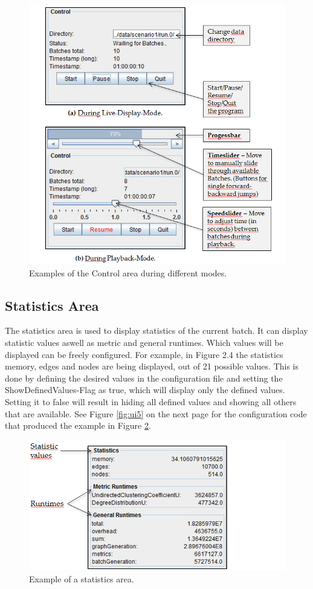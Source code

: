 \begin{figure} [h]
\centering
\includegraphics [scale=0.8] {images/ui3}
\caption{Examples of the Control area during different modes.
}
\label{fig:ui3}
\end{figure}

\subsection{Statistics Area}
The statistics area is used to display statistics of the current batch. It can display statistic values aswell as metric and general runtimes. Which values will be displayed can be freely configured. For example, in Figure 2.4 the statistics memory, edges and nodes are being displayed, out of 21 possible values. This is done by defining the desired values in the configuration file and setting the ShowDefinedValues-Flag as true, which will display only the defined values. Setting it to false will result in hiding all defined values and showing all others that are available. See Figure \ref{fig:ui5} on the next page for the configuration code that produced the example in Figure \ref{fig:ui4}.

\begin{figure} [h]
\centering
\includegraphics [scale=0.8] {images/ui4}
\caption{Example of a statistics area.}
\label{fig:ui4}
\end{figure}

